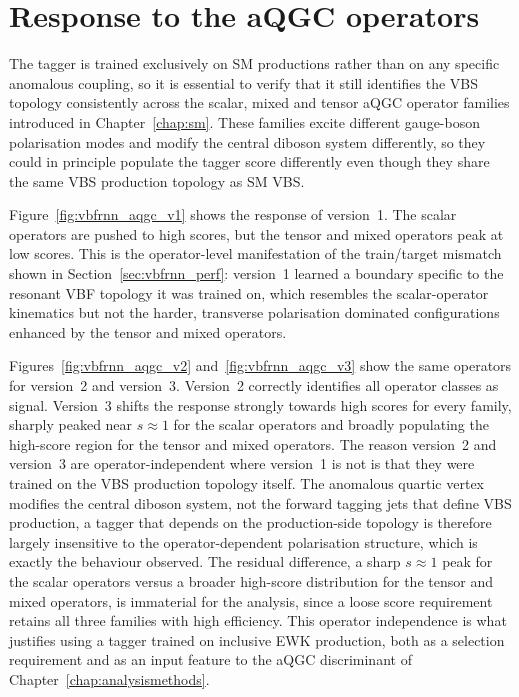 \section{Response to the aQGC operators}
\label{sec:vbfrnn_aqgc}

The tagger is trained exclusively on SM productions rather than on any specific anomalous coupling, so it is essential to verify that it still identifies the VBS topology consistently across the scalar, mixed and tensor aQGC operator families introduced in Chapter~\ref{chap:sm}. These families excite different gauge-boson polarisation modes and modify the central diboson system differently, so they could in principle populate the tagger score differently even though they share the same VBS production topology as SM VBS.

Figure~\ref{fig:vbfrnn_aqgc_v1} shows the response of version~1. The scalar operators are pushed to high scores, but the tensor and mixed operators peak at low scores. This is the operator-level manifestation of the train/target mismatch shown in Section~\ref{sec:vbfrnn_perf}: version~1 learned a boundary specific to the resonant VBF topology it was trained on, which resembles the scalar-operator kinematics but not the harder, transverse polarisation dominated configurations enhanced by the tensor and mixed operators.

Figures~\ref{fig:vbfrnn_aqgc_v2} and~\ref{fig:vbfrnn_aqgc_v3} show the same operators for version~2 and version~3. Version~2 correctly identifies all operator classes as signal. Version~3 shifts the response strongly towards high scores for every family, sharply peaked near $s\approx1$ for the scalar operators and broadly populating the high-score region for the tensor and mixed operators. The reason version~2 and version~3 are operator-independent where version~1 is not is that they were trained on the VBS production topology itself. The anomalous quartic vertex modifies the central diboson system, not the forward tagging jets that define VBS production, a tagger that depends on the production-side topology is therefore largely insensitive to the operator-dependent polarisation structure, which is exactly the behaviour observed. The residual difference, a sharp $s\approx1$ peak for the scalar operators versus a broader high-score distribution for the tensor and mixed operators, is immaterial for the analysis, since a loose score requirement retains all three families with high efficiency. This operator independence is what justifies using a tagger trained on inclusive EWK production, both as a selection requirement and as an input feature to the aQGC discriminant of Chapter~\ref{chap:analysismethods}.

